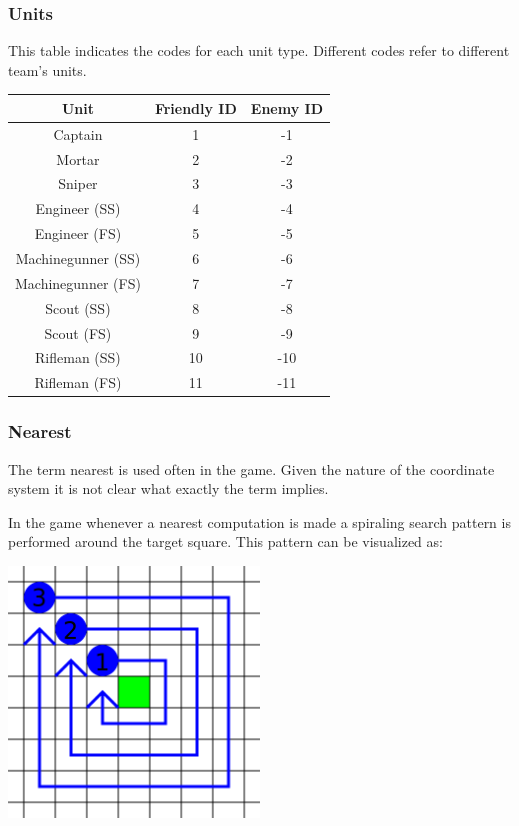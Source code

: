 \documentclass{article}
\begin{document}
\subsubsection{Units}

This table indicates the codes for each unit type. Different codes refer to
different team's units.

\begin{minipage}{\textwidth}
\centering
\begin{tabular}{|c|c|c|}
    \hline Unit & Friendly ID & Enemy ID \\ \hline
    Captain & 1 & -1 \\ \hline
    Mortar & 2 & -2 \\ \hline
    Sniper & 3 & -3 \\ \hline
    Engineer (SS) & 4 & -4 \\ \hline
    Engineer (FS) & 5 & -5 \\ \hline
    Machinegunner (SS) & 6 & -6 \\ \hline
    Machinegunner (FS) & 7 & -7 \\ \hline
    Scout (SS) & 8 & -8 \\ \hline
    Scout (FS) & 9 & -9 \\ \hline
    Rifleman (SS) & 10 & -10 \\ \hline
    Rifleman (FS) & 11 & -11 \\ \hline
\end{tabular}
\end{minipage}

\subsubsection{Nearest}

The term nearest is used often in the game. Given the nature of the coordinate
system it is not clear what exactly the term implies.

In the game whenever a nearest computation is made a spiraling search pattern is
performed around the target square. This pattern can be visualized as:

{\centering\includegraphics[width=0.5\textwidth]{res/nearest.png}\par}
\end{document}
